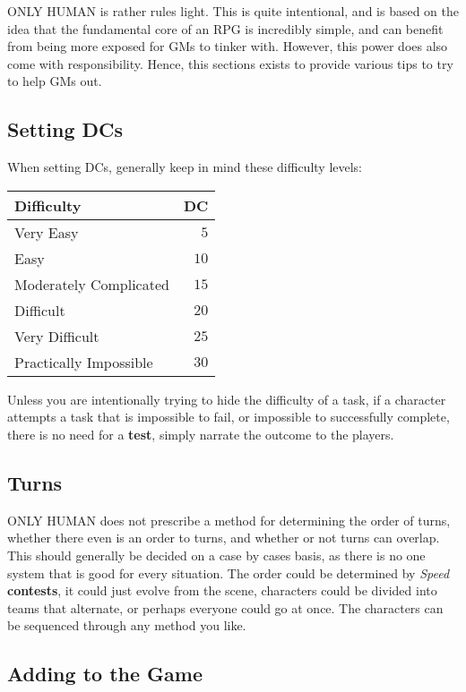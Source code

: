 \documentclass[11pt]{article}
\begin{document}
\begin{multicols}{3}
  ONLY HUMAN is rather rules light. This is quite intentional, and is based on the idea that the fundamental core of an RPG is incredibly simple, and can benefit from being more exposed for GMs to tinker with. However, this power does also come with responsibility. Hence, this sections exists to provide various tips to try to help GMs out.

  \subsection*{Setting DCs}

  When setting DCs, generally keep in mind these difficulty levels:

  \begin{center}
    \begin{tabular}{ lr }
      Difficulty & DC \\
      \hline
      Very Easy & $5$ \\
      Easy & $10$ \\
      Moderately Complicated & $15$ \\
      Difficult & $20$ \\
      Very Difficult & $25$ \\
      Practically Impossible & $30$
    \end{tabular}
  \end{center}

  Unless you are intentionally trying to hide the difficulty of a task, if a character attempts a task that is impossible to fail, or impossible to successfully complete, there is no need for a \textbf{test}, simply narrate the outcome to the players.

  \subsection*{Turns}

  ONLY HUMAN does not prescribe a method for determining the order of turns, whether there even is an order to turns, and whether or not turns can overlap. This should generally be decided on a case by cases basis, as there is no one system that is good for every situation. The order could be determined by \textit{Speed} \textbf{contests}, it could just evolve from the scene, characters could be divided into teams that alternate, or perhaps everyone could go at once. The characters can be sequenced through any method you like.

  \subsection*{Adding to the Game}


\end{multicols}
\end{document}
